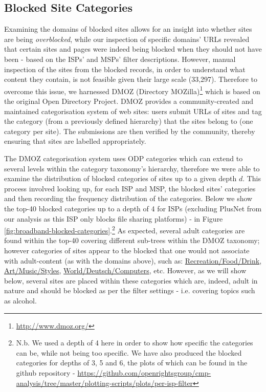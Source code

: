 \documentclass{bmcart}
\begin{document}
\subsection*{Blocked Site Categories}
Examining the domains of blocked sites allows for an insight into whether sites are being \textit{overblocked}, while our inspection of specific domains' URLs revealed that certain sites and pages were indeed being blocked when they should not have been - based on the ISPs' and MSPs' filter descriptions.
However, manual inspection of the sites from the blocked records, in order to understand what content they contain, is not feasible given their large scale (33,297).
Therefore to overcome this issue, we harnessed DMOZ (Directory MOZilla)\footnote{\url{http://www.dmoz.org/}} which is based on the original Open Directory Project.
DMOZ provides a community-created and maintained categorisation system of web sites: users submit URLs of sites and tag the category (from a previously defined hierarchy) that the sites belong to (one category per site).
The submissions are then verified by the community, thereby ensuring that sites are labelled appropriately.

The DMOZ categorisation system uses ODP categories which can extend to several levels within the category taxonomy's hierarchy, therefore we were able to examine the distribution of blocked categories of sites up to a given depth $d$.
This process involved looking up, for each ISP and MSP, the blocked sites' categories and then recording the frequency distribution of the categories.
Below we show the top-40 blocked categories up to a depth of 4 for ISPs (excluding PlusNet from our analysis as this ISP only blocks file sharing platforms) - in Figure \ref{fig:broadband-blocked-categories}.\footnote{N.b. We used a depth of 4 here in order to show how specific the categories can be, while not being too specific. We have also produced the blocked categories for depths of 3, 5 and 6, the plots of which can be found in the github repository - \url{https://github.com/openrightsgroup/cmp-analysis/tree/master/plotting-scripts/plots/per-isp-filter}}
As expected, several adult categories are found within the top-40 covering different sub-trees within the DMOZ taxonomy; however categories of sites appear to the blocked that one would not associate with adult-content (as with the domains above), such as: \url{Recreation/Food/Drink}, \url{Art/Music/Styles}, \url{World/Deutsch/Computers}, etc.
However, as we will show below, several sites are placed within these categories which are, indeed, adult in nature and should be blocked as per the filter settings - i.e. covering topics such as alcohol.
\end{document}
